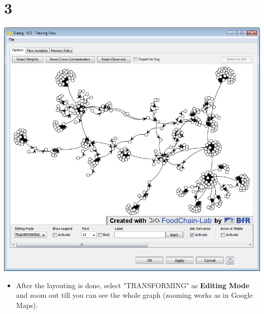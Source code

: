 \documentclass{beamer}
\begin{document}
\section{3}
\begin{frame}
	\begin{center}
  		\includegraphics[height=0.6\textheight]{3.png}
	\end{center}
	\begin{itemize}
		\item After the layouting is done, select "TRANSFORMING" as \textbf{Editing Mode} and zoom out till you can see the whole graph (zooming works as in Google Maps).
	\end{itemize}
\end{frame}
\end{document}
